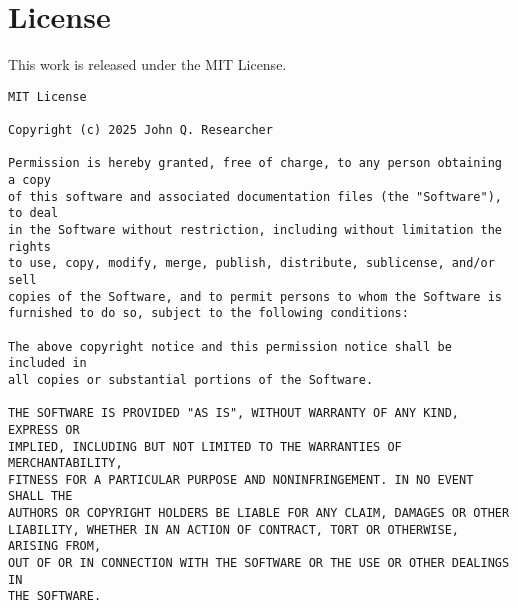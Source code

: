 \documentclass[11pt]{article}
\begin{document}
\section*{License}
This work is released under the MIT License.
\begin{verbatim}
MIT License

Copyright (c) 2025 John Q. Researcher

Permission is hereby granted, free of charge, to any person obtaining a copy
of this software and associated documentation files (the "Software"), to deal
in the Software without restriction, including without limitation the rights
to use, copy, modify, merge, publish, distribute, sublicense, and/or sell
copies of the Software, and to permit persons to whom the Software is
furnished to do so, subject to the following conditions:

The above copyright notice and this permission notice shall be included in
all copies or substantial portions of the Software.

THE SOFTWARE IS PROVIDED "AS IS", WITHOUT WARRANTY OF ANY KIND, EXPRESS OR
IMPLIED, INCLUDING BUT NOT LIMITED TO THE WARRANTIES OF MERCHANTABILITY,
FITNESS FOR A PARTICULAR PURPOSE AND NONINFRINGEMENT. IN NO EVENT SHALL THE
AUTHORS OR COPYRIGHT HOLDERS BE LIABLE FOR ANY CLAIM, DAMAGES OR OTHER
LIABILITY, WHETHER IN AN ACTION OF CONTRACT, TORT OR OTHERWISE, ARISING FROM,
OUT OF OR IN CONNECTION WITH THE SOFTWARE OR THE USE OR OTHER DEALINGS IN
THE SOFTWARE.
\end{verbatim}



\end{document}
